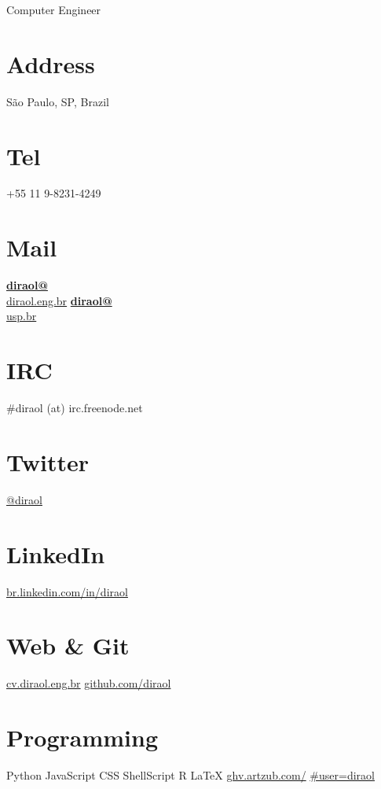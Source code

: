 \documentclass[]{friggeri-cv}
\begin{document}
\thispagestyle{empty}
      {Computer Engineer}


\begin{aside}
  \section{Address}
    São Paulo, SP, Brazil
    ~
  \section{Tel}
    +55 11 9-8231-4249
    ~
  \section{Mail}
    \href{mailto:diraol@diraol.eng.br}{\textbf{diraol@}\\diraol.eng.br}
    \href{mailto:diraol@usp.br}{\textbf{diraol@}\\usp.br}
    ~
  \section{IRC}
    \#diraol (at) irc.freenode.net
    ~
  \section{Twitter}
    \href{http://twitter.com/diraol}{@diraol}
    ~
  \section{LinkedIn}
    \href{http://br.linkedin.com/in/diraol}{br.linkedin.com/in/diraol}
    ~
  \section{Web \& Git}
    \href{http://cv.diraol.eng.br}{cv.diraol.eng.br}
    \href{https://github.com/diraol}{github.com/diraol}
    ~
  \section{Programming}
    Python
    JavaScript
    CSS
    ShellScript
    R
    \LaTeX
    \href{http://ghv.artzub.com/\#user=diraol}{ghv.artzub.com/}
    \href{http://ghv.artzub.com/\#user=diraol}{\#user=diraol}
    ~

\end{aside}
\end{document}
